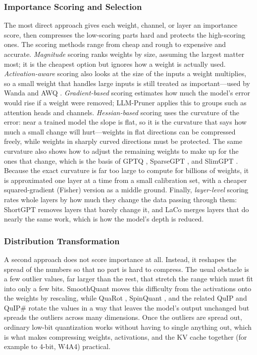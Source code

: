 \subsubsection{Importance Scoring and Selection}

The most direct approach gives each weight, channel, or layer an importance score, then compresses the low-scoring parts hard and protects the high-scoring ones. The scoring methods range from cheap and rough to expensive and accurate. \emph{Magnitude} scoring ranks weights by size, assuming the largest matter most; it is the cheapest option but ignores how a weight is actually used. \emph{Activation-aware} scoring also looks at the size of the inputs a weight multiplies, so a small weight that handles large inputs is still treated as important---used by Wanda \cite{sun2024wanda} and AWQ \cite{lin2024awq}. \emph{Gradient-based} scoring estimates how much the model's error would rise if a weight were removed; LLM-Pruner \cite{ma2023llmpruner} applies this to groups such as attention heads and channels. \emph{Hessian-based} scoring uses the curvature of the error: near a trained model the slope is flat, so it is the curvature that says how much a small change will hurt---weights in flat directions can be compressed freely, while weights in sharply curved directions must be protected. The same curvature also shows how to adjust the remaining weights to make up for the ones that change, which is the basis of GPTQ \cite{frantar2023gptq}, SparseGPT \cite{frantar2023sparsegpt}, and SlimGPT \cite{ling2024slimgpt}. Because the exact curvature is far too large to compute for billions of weights, it is approximated one layer at a time from a small calibration set, with a cheaper squared-gradient (Fisher) version as a middle ground. Finally, \emph{layer-level} scoring rates whole layers by how much they change the data passing through them: ShortGPT \cite{men2024shortgpt} removes layers that barely change it, and LaCo \cite{yang2024laco} merges layers that do nearly the same work, which is how the model's depth is reduced.

\subsubsection{Distribution Transformation}

A second approach does not score importance at all. Instead, it reshapes the spread of the numbers so that no part is hard to compress. The usual obstacle is a few outlier values, far larger than the rest, that stretch the range which must fit into only a few bits. SmoothQuant \cite{xiao2023smoothquant} moves this difficulty from the activations onto the weights by rescaling, while QuaRot \cite{ashkboos2024quarot}, SpinQuant \cite{liu2025spinquant}, and the related QuIP and QuIP\# \cite{chee2023quip,tseng2024quipsharp} rotate the values in a way that leaves the model's output unchanged but spreads the outliers across many dimensions. Once the outliers are spread out, ordinary low-bit quantization works without having to single anything out, which is what makes compressing weights, activations, and the KV cache together (for example to 4-bit, W4A4) practical.


